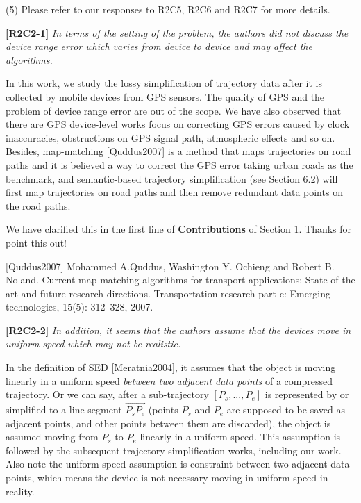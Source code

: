 \documentclass{letter}
\begin{document}
(5) Please refer to our responses to R2C5, R2C6 and R2C7 for more details.

\textbf{[R2C2-1]} \emph{In terms of the setting of the problem, the authors did not discuss the device range error which varies from device to device and may affect the algorithms.}

In this work, we study the lossy simplification of trajectory data after it is collected by mobile devices from GPS sensors. The quality of GPS and the problem of device range error are out of the scope.
%
We have also observed that there are GPS device-level works focus on correcting GPS errors caused by clock inaccuracies, obstructions on GPS signal path, atmospheric effects and so on. Besides, map-matching [Quddus2007] is a method that maps trajectories on road paths and it is believed a way to correct the GPS error taking urban roads as the benchmark, and semantic-based trajectory simplification (see Section 6.2) will first map trajectories on road paths and then remove redundant data points on the road paths.

We have clarified this in the first line of \textbf{Contributions} of Section 1. Thanks for point this out!


[Quddus2007] Mohammed A.Quddus, Washington Y. Ochieng and Robert B. Noland. Current map-matching algorithms for transport applications: State-of-the art and future research directions. {Transportation research part c: Emerging technologies}, 15(5): 312--328, 2007.

\textbf{[R2C2-2]} \emph{In addition, it seems that the authors assume that the devices move in uniform speed which may not be realistic.}

In the definition of SED [Meratnia2004], it assumes that the object is moving linearly in a uniform speed \textit{between two adjacent data points} of a compressed trajectory. Or we can say, after a sub-trajectory $[P_s, ..., P_e]$ is represented by or simplified to a line segment $\overrightarrow{P_sP_e}$ (points $P_s$ and $P_e$ are supposed to be saved as adjacent points, and other points between them are discarded), the object is assumed moving from $P_s$ to $P_e$ linearly in a uniform speed. This assumption is followed by the subsequent trajectory simplification works, including our work. Also note the uniform speed assumption is constraint between two adjacent data points, which means the device is not necessary moving in uniform speed in reality.
\end{document}
